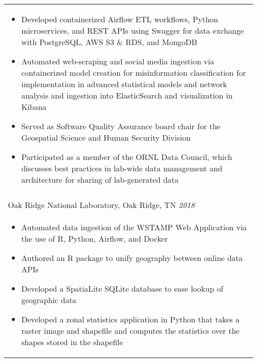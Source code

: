 \documentclass[10pt]{article}%
\begin{document}
\begin{tabularx}{\linewidth}{M}
\begin{itemize}[topsep=-12pt,parsep=0em]
          \item Developed containerized Airflow ETL workflows, Python microservices, and REST APIs using Swagger for data exchange with PostgreSQL, AWS S3 \& RDS, and MongoDB %
          \item Automated web-scraping and social media ingestion via containerized model creation for misinformation classification for implementation in advanced statistical models and network analysis and ingestion into ElasticSearch and visualization in Kibana %
          \item Served as Software Quality Assurance board chair for the Geospatial Science and Human Security Division %
          \item Participated as a member of the ORNL Data Council, which discusses best practices in lab-wide data management and architecture for sharing of lab-generated data %
      \end{itemize} \\
            \\
      Oak Ridge National Laboratory, Oak Ridge, TN \textit{2018 } \\
      \begin{itemize}[topsep=-12pt,parsep=0em]
          \setlength\itemsep{0em}
          \item Automated data ingestion of the WSTAMP Web Application via the use of R, Python, Airflow, and Docker %
          \item Authored an R package to unify geography between online data APIs %
          \item Developed a SpatiaLite SQLite database to ease lookup of geographic data %
          \item Developed a zonal statistics application in Python that takes a raster image and shapefile and computes the statistics over the shapes stored in the shapefile %
        \end{itemize} \\
   \end{tabularx}
   \newpage
\end{document}
